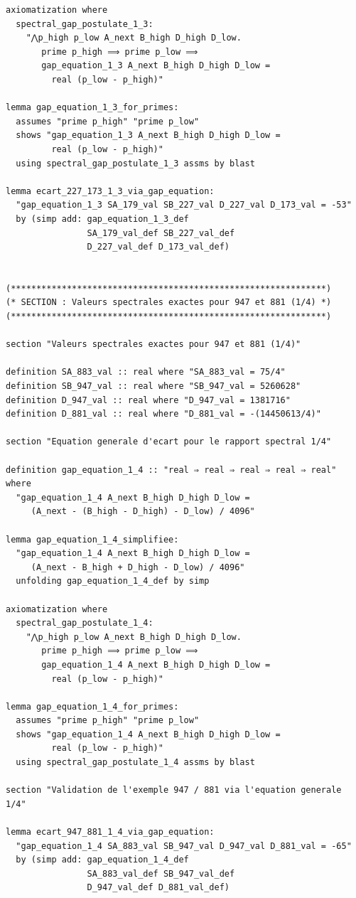 \documentclass[a4paper,11pt]{article}
\begin{document}
\begin{holcode}[title={\textcolor{white}{File: methode\_spectral.thy -- Part 6/6 (END)}}]
\begin{lstlisting}
axiomatization where
  spectral_gap_postulate_1_3:
    "⋀p_high p_low A_next B_high D_high D_low.
       prime p_high ⟹ prime p_low ⟹
       gap_equation_1_3 A_next B_high D_high D_low =
         real (p_low - p_high)"

lemma gap_equation_1_3_for_primes:
  assumes "prime p_high" "prime p_low"
  shows "gap_equation_1_3 A_next B_high D_high D_low =
         real (p_low - p_high)"
  using spectral_gap_postulate_1_3 assms by blast

lemma ecart_227_173_1_3_via_gap_equation:
  "gap_equation_1_3 SA_179_val SB_227_val D_227_val D_173_val = -53"
  by (simp add: gap_equation_1_3_def
                SA_179_val_def SB_227_val_def
                D_227_val_def D_173_val_def)


(**************************************************************)
(* SECTION : Valeurs spectrales exactes pour 947 et 881 (1/4) *)
(**************************************************************)

section "Valeurs spectrales exactes pour 947 et 881 (1/4)"

definition SA_883_val :: real where "SA_883_val = 75/4"
definition SB_947_val :: real where "SB_947_val = 5260628"
definition D_947_val :: real where "D_947_val = 1381716"
definition D_881_val :: real where "D_881_val = -(14450613/4)"

section "Equation generale d'ecart pour le rapport spectral 1/4"

definition gap_equation_1_4 :: "real ⇒ real ⇒ real ⇒ real ⇒ real" where
  "gap_equation_1_4 A_next B_high D_high D_low =
     (A_next - (B_high - D_high) - D_low) / 4096"

lemma gap_equation_1_4_simplifiee:
  "gap_equation_1_4 A_next B_high D_high D_low =
     (A_next - B_high + D_high - D_low) / 4096"
  unfolding gap_equation_1_4_def by simp

axiomatization where
  spectral_gap_postulate_1_4:
    "⋀p_high p_low A_next B_high D_high D_low.
       prime p_high ⟹ prime p_low ⟹
       gap_equation_1_4 A_next B_high D_high D_low =
         real (p_low - p_high)"

lemma gap_equation_1_4_for_primes:
  assumes "prime p_high" "prime p_low"
  shows "gap_equation_1_4 A_next B_high D_high D_low =
         real (p_low - p_high)"
  using spectral_gap_postulate_1_4 assms by blast

section "Validation de l'exemple 947 / 881 via l'equation generale 1/4"

lemma ecart_947_881_1_4_via_gap_equation:
  "gap_equation_1_4 SA_883_val SB_947_val D_947_val D_881_val = -65"
  by (simp add: gap_equation_1_4_def
                SA_883_val_def SB_947_val_def
                D_947_val_def D_881_val_def)


\end{lstlisting}
\end{holcode}
\end{document}
